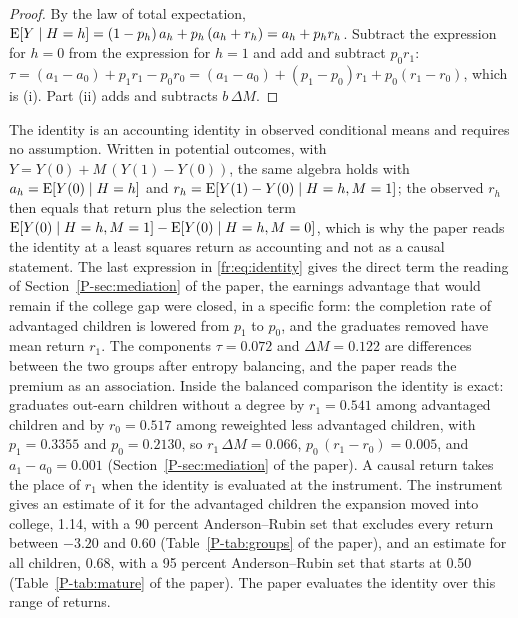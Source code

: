 \begin{proof}
By the law of total expectation, $\mathrm{E}[Y \mid H = h] = (1 - p_h)\,a_h + p_h\,(a_h + r_h) = a_h + p_h r_h$. Subtract the expression for $h = 0$
from the expression for $h = 1$ and add and subtract $p_0 r_1$:
$\tau = (a_1 - a_0) + p_1 r_1 - p_0 r_0 = (a_1 - a_0) + (p_1 - p_0)r_1 + p_0(r_1 - r_0)$,
which is (i). Part (ii) adds and subtracts $b\,\Delta M$.
\end{proof}

The identity is an accounting identity in observed conditional means and
requires no assumption. Written in potential outcomes, with
$Y = Y(0) + M\,(Y(1) - Y(0))$, the same algebra holds with
$a_h = \mathrm{E}[Y(0) \mid H = h]$ and $r_h = \mathrm{E}[Y(1) - Y(0) \mid H = h, M = 1]$;
the observed $r_h$ then equals that return plus the selection term
$\mathrm{E}[Y(0) \mid H = h, M = 1] - \mathrm{E}[Y(0) \mid H = h, M = 0]$, which is why the
paper reads the identity at a least squares return as accounting and not as
a causal statement. The last expression in \eqref{fr:eq:identity} gives the
direct term the reading of Section~\ref{P-sec:mediation} of the paper, the
earnings advantage that would remain if the college gap were closed, in a
specific form: the completion rate of advantaged children is lowered from
$p_1$ to $p_0$, and the graduates removed have mean return $r_1$. The
components $\tau = 0.072$ and $\Delta M = 0.122$ are differences between
the two groups after entropy balancing, and the paper reads the premium
as an association. Inside the balanced comparison the identity is exact:
graduates out-earn children without a degree by $r_1 = 0.541$ among
advantaged children and by $r_0 = 0.517$ among reweighted less advantaged
children, with $p_1 = 0.3355$ and $p_0 = 0.2130$, so
$r_1\,\Delta M = 0.066$, $p_0\,(r_1 - r_0) = 0.005$, and
$a_1 - a_0 = 0.001$ (Section~\ref{P-sec:mediation} of the paper). A causal
return takes the place of $r_1$ when the identity is evaluated at the
instrument. The instrument gives an estimate of it for the advantaged
children the expansion moved into college, 1.14, with a 90 percent
Anderson--Rubin set that excludes every return between $-3.20$ and 0.60
(Table~\ref{P-tab:groups} of the paper), and an estimate for all children,
0.68, with a 95 percent Anderson--Rubin set that starts at 0.50
(Table~\ref{P-tab:mature} of the paper). The paper evaluates the identity
over this range of returns.

